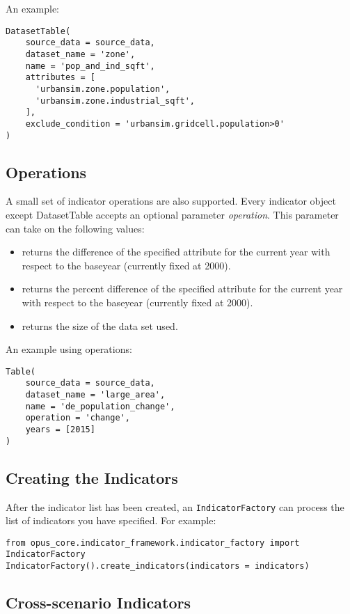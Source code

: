 An example:
\begin{verbatim}
DatasetTable(
    source_data = source_data,
    dataset_name = 'zone',
    name = 'pop_and_ind_sqft',
    attributes = [ 
      'urbansim.zone.population',
      'urbansim.zone.industrial_sqft',                     
    ],
    exclude_condition = 'urbansim.gridcell.population>0' 
)
\end{verbatim}

\subsection{Operations}

A small set of indicator operations are also supported. 
Every indicator object except DatasetTable 
accepts an optional parameter \emph{operation}. This parameter can take on the
following values:

\begin{itemize}
\tight
  \item {} returns the difference of the specified
  attribute for the current year with respect to the baseyear (currently fixed
  at 2000).
  \item {} returns the percent difference of the specified
  attribute for the current year with respect to the baseyear (currently fixed
  at 2000). 
  \item {} returns the size of the data set used.
\end{itemize}

An example using operations:
\begin{verbatim}
Table(
    source_data = source_data,
    dataset_name = 'large_area',
    name = 'de_population_change',
    operation = 'change',
    years = [2015]
)
\end{verbatim}

\subsection{Creating the Indicators}
After the indicator list has been created, an
\verb|IndicatorFactory| can process the list of indicators you have specified. 
For example:

\begin{verbatim}
from opus_core.indicator_framework.indicator_factory import IndicatorFactory
IndicatorFactory().create_indicators(indicators = indicators)
\end{verbatim}

\subsection{Cross-scenario Indicators}
\label{sec:indicator-cross-scenario}

